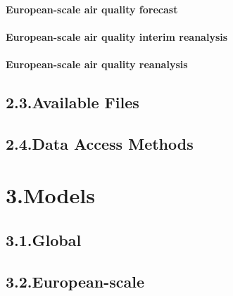\documentclass[9pt]{article}
\begin{document}
\paragraph{European-scale air quality forecast}\label{sec-european-scale-air-quality-forecast}%

\paragraph{European-scale air quality interim reanalysis}\label{sec-european-scale-air-quality-interim-reanalysis}%

\paragraph{European-scale air quality reanalysis}\label{sec-european-scale-air-quality-reanalysis}%

\subsection{2.3.\hspace*{0.5em}Available Files}\label{sec-available-files}%

\subsection{2.4.\hspace*{0.5em}Data Access Methods}\label{sec-data-access-methods}%

\section{3.\hspace*{0.5em}Models}\label{sec-models}%

\subsection{3.1.\hspace*{0.5em}Global}\label{sec-global}%

\subsection{3.2.\hspace*{0.5em}European-scale}\label{sec-european-scale}%
\end{document}
